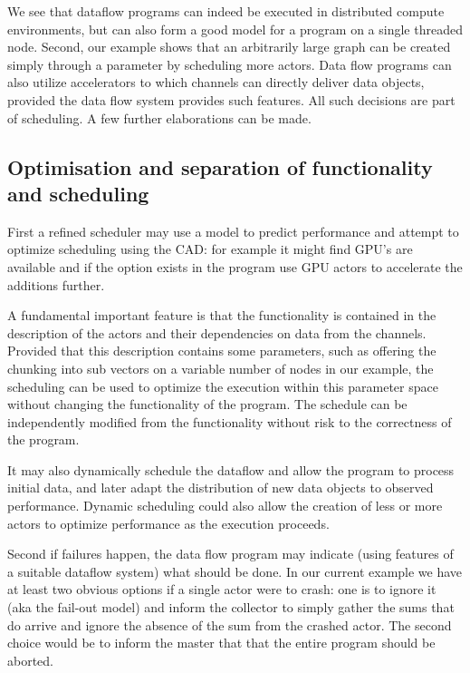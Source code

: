 \documentclass[11pt,a4paper]{article}
\begin{document}
We see that dataflow programs can indeed be executed in distributed
compute environments, but can also form a good model for a program on
a single threaded node.  Second, our example shows that an arbitrarily
large graph can be created simply through a parameter by scheduling
more actors.  Data flow programs can also utilize accelerators to
which channels can directly deliver data objects, provided the data
flow system provides such features.  All such decisions are part of
scheduling.  A few further elaborations can be made.

\subsection{Optimisation and separation of functionality and scheduling}

First a refined scheduler may use a model to predict performance and attempt to optimize scheduling using the CAD: for example it might find GPU’s are available and if the option exists in the program use GPU actors to accelerate the additions further.    

A fundamental important feature is that the functionality is contained in the description of the actors and their dependencies on data from the channels.  Provided that this description contains some parameters, such as offering the chunking into sub vectors on a variable number of nodes in our example, the scheduling can be used to optimize the execution within this parameter space without changing the functionality of the program.  The schedule can be independently modified from the functionality without risk to the correctness of the program.

It may also dynamically schedule the dataflow and allow the program to process initial data, and later adapt the distribution of new data objects to observed performance.  Dynamic scheduling could also allow the creation of less or more actors to optimize performance as the execution proceeds. 

Second if failures happen, the data flow program may indicate (using features of a suitable dataflow system) what should be done.   In our current example we have at least two obvious options if a single actor were to crash: one is to ignore it (aka the fail-out model) and inform the collector to simply gather the sums that do arrive and ignore the absence of the sum from the crashed actor.  The second choice would be to inform the master that that the entire program should be aborted.
\end{document}
